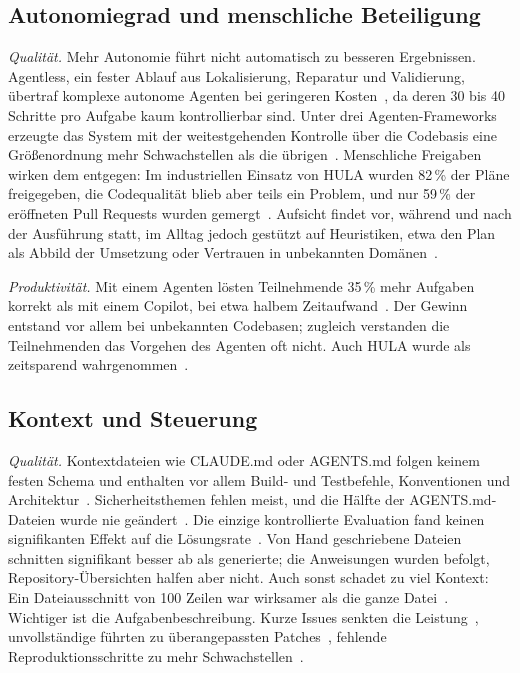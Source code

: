 \subsection{Autonomiegrad und menschliche Beteiligung}
\label{sec:ergebnisse-autonomie}

\textit{Qualität.} Mehr Autonomie führt nicht automatisch zu besseren Ergebnissen. Agentless, ein fester Ablauf aus Lokalisierung, Reparatur und Validierung, übertraf komplexe autonome Agenten bei geringeren Kosten~\cite{xia2025agentless}, da deren 30 bis 40 Schritte pro Aufgabe kaum kontrollierbar sind. Unter drei Agenten-Frameworks erzeugte das System mit der weitestgehenden Kontrolle über die Codebasis eine Größenordnung mehr Schwachstellen als die übrigen~\cite{sajadi2025patchsecurity}. Menschliche Freigaben wirken dem entgegen: Im industriellen Einsatz von HULA wurden 82\,\% der Pläne freigegeben, die Codequalität blieb aber teils ein Problem, und nur 59\,\% der eröffneten Pull Requests wurden gemergt~\cite{takerngsaksiri2025hula}. Aufsicht findet vor, während und nach der Ausführung statt, im Alltag jedoch gestützt auf Heuristiken, etwa den Plan als Abbild der Umsetzung oder Vertrauen in unbekannten Domänen~\cite{dhanorkar2026oversight}.

\textit{Produktivität.} Mit einem Agenten lösten Teilnehmende 35\,\% mehr Aufgaben korrekt als mit einem Copilot, bei etwa halbem Zeitaufwand~\cite{chen2025codewithme}. Der Gewinn entstand vor allem bei unbekannten Codebasen; zugleich verstanden die Teilnehmenden das Vorgehen des Agenten oft nicht. Auch HULA wurde als zeitsparend wahrgenommen~\cite{takerngsaksiri2025hula}.

\subsection{Kontext und Steuerung}
\label{sec:ergebnisse-kontext}

\textit{Qualität.} Kontextdateien wie CLAUDE.md oder AGENTS.md folgen keinem festen Schema und enthalten vor allem Build- und Testbefehle, Konventionen und Architektur~\cite{chatlatanagulchai2025manifests,mohsenimofidi2026context}. Sicherheitsthemen fehlen meist, und die Hälfte der AGENTS.md-Dateien wurde nie geändert~\cite{mohsenimofidi2026context}. Die einzige kontrollierte Evaluation fand keinen signifikanten Effekt auf die Lösungsrate~\cite{gloaguen2026agentsmd}. Von Hand geschriebene Dateien schnitten signifikant besser ab als generierte; die Anweisungen wurden befolgt, Repository-Übersichten halfen aber nicht. Auch sonst schadet zu viel Kontext: Ein Dateiausschnitt von 100 Zeilen war wirksamer als die ganze Datei~\cite{yang2024sweagent}. Wichtiger ist die Aufgabenbeschreibung. Kurze Issues senkten die Leistung~\cite{takerngsaksiri2025hula}, unvollständige führten zu überangepassten Patches~\cite{zhang2024autocoderover}, fehlende Reproduktionsschritte zu mehr Schwachstellen~\cite{sajadi2025patchsecurity}.

